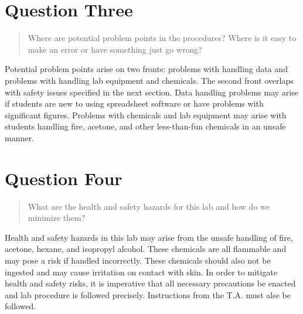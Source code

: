 \documentclass[11pt, letterpaper]{article}
\begin{document}
\section{Question Three}
\begin{quote}
    Where are potential problem points in the procedures? Where is it easy to make an error 
    or have something just go wrong?
\end{quote}
Potential problem points arise on two fronts: problems with handling data and 
problems with handling lab equipment and chemicals. 
The second front overlaps with safety issues specified in the next section.
Data handling problems may arise if students are new to using spreadsheet software
or have problems with significant figures. 
Problems with chemicals and lab equipment may arise with students handling fire,
acetone, and other less-than-fun chemicals in an unsafe manner.

\section{Question Four}
\begin{quote}
    What are the health and safety hazards for this lab and how do we minimize them?
\end{quote}
Health and safety hazards in this lab may arise from the unsafe handling of fire, acetone,
hexane, and isopropyl alcohol.
These chemicals are all flammable and may pose a risk if handled incorrectly.
These chemicals should also not be ingested and may cause irritation on contact with skin.
In order to mitigate health and safety risks, it is imperative that all necessary precautions
be enacted and lab procedure is followed precisely.
Instructions from the T.A. must alse be followed.
\end{document}
